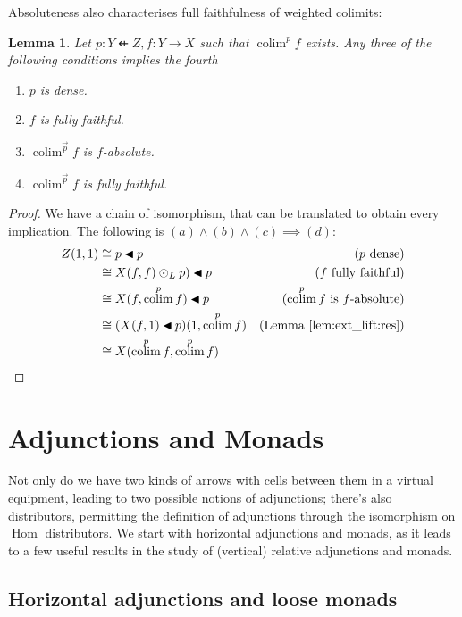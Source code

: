 \documentclass[10pt,a4paper]{article}
\newcommand{\dfrom}{\nvleftarrow}
\newcommand{\rift}{\mathbin{\blacktriangleleft}}
\newcommand{\simeqq}{\cong}
\DeclareMathOperator{\Hom}{Hom}
\DeclareMathOperator{\colim}{colim}
\theoremstyle{plain}
\newtheorem{lemma}[theorem]{Lemma}
\theoremstyle{definition}
\theoremstyle{remark}
\begin{document}
Absoluteness also characterises full faithfulness of weighted colimits:

\begin{lemma}
    Let $p : Y \dfrom Z, f : Y \to X$ such that $\colim^pf$ exists. Any three of the following conditions implies the fourth
    \begin{enumerate}
        \item $p$ is dense.
        \item $f$ is fully faithful.
        \item $\colim^{\vec p}f$ is $f$-absolute.
        \item $\colim^{\vec p}f$ is fully faithful.
    \end{enumerate}
\end{lemma}

\begin{proof}
    We have a chain of isomorphism, that can be translated to obtain every implication. The following is $(a)\land(b)\land(c)\implies(d)$:
    \begin{align*}
        Z(1, 1) &\simeqq p\rift p & (p\text{ dense})\\
                &\simeqq X(f, f)\odot_L p)\rift p & (f\text{ fully faithful})\\
                &\simeqq X(f, \colim^pf)\rift p & (\colim^pf\text{ is $f$-absolute})\\
                &\simeqq (X(f, 1)\rift p)(1, \colim^pf) & \text{(Lemma \ref{lem:ext_lift:res})}\\
                &\simeqq X(\colim^pf, \colim^pf)
    \end{align*}
\end{proof}

\section{Adjunctions and Monads}

Not only do we have two kinds of arrows with cells between them in a virtual equipment, leading to two possible notions of adjunctions; there's also distributors, permitting the definition of adjunctions through the isomorphism on $\Hom$ distributors. We start with horizontal adjunctions and monads, as it leads to a few useful results in the study of (vertical) relative adjunctions and monads.

\subsection{Horizontal adjunctions and loose monads}
\label{subsec:hadj}
\end{document}
